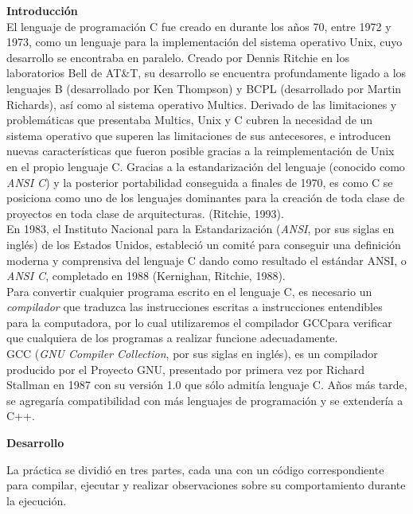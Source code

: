 \documentclass[a4paper,12pt]{report}
\begin{document}
\textbf{\Large Introducción}\\
\vspace{0.5cm}
El lenguaje de programación C fue creado en durante los años 70, entre 1972 y 1973, como un lenguaje para la implementación del sistema operativo Unix, cuyo desarrollo se encontraba en paralelo.
Creado por Dennis Ritchie en los laboratorios Bell de AT\&T, su desarrollo se encuentra profundamente ligado a los lenguajes B (desarrollado por Ken Thompson) y BCPL (desarrollado por Martin Richards), así como al sistema operativo Multics. Derivado de las limitaciones y problemáticas que presentaba Multics, Unix y C cubren la necesidad de un sistema operativo que superen las limitaciones de sus antecesores, e introducen nuevas características que fueron posible gracias a la reimplementación de Unix en el propio lenguaje C.
Gracias a la estandarización del lenguaje (conocido como \emph{ANSI C}) y la posterior portabilidad conseguida a finales de 1970, es como C se posiciona como uno de los lenguajes dominantes para la creación de toda clase de proyectos en toda clase de arquitecturas.
(Ritchie, 1993).\\
En 1983, el Instituto Nacional para la Estandarización (\emph{ANSI}, por sus siglas en inglés) de los Estados Unidos, estableció un comité para conseguir una definición moderna y comprensiva del lenguaje C dando como resultado el estándar ANSI, o \emph{ANSI C}, completado en 1988 (Kernighan, Ritchie, 1988).\\
Para convertir cualquier programa escrito en el lenguaje C, es necesario un \emph{compilador} que traduzca las instrucciones escritas a instrucciones entendibles para la computadora, por lo cual utilizaremos el compilador GCC\textregistered para verificar que cualquiera de los programas a realizar funcione adecuadamente.\\
GCC (\emph{GNU Compiler Collection}, por sus siglas en inglés), es un compilador producido por el Proyecto GNU, presentado por primera vez por Richard Stallman en 1987 con su versión 1.0 que sólo admitía lenguaje C. Años más tarde, se agregaría compatibilidad con más lenguajes de programación y se extendería a C++.\\

\newpage

\textbf{\Large Desarrollo}\\

\vspace{1cm}

La práctica se dividió en tres partes, cada una con un código correspondiente para compilar, ejecutar y realizar observaciones sobre su comportamiento durante la ejecución.\\
\end{document}
